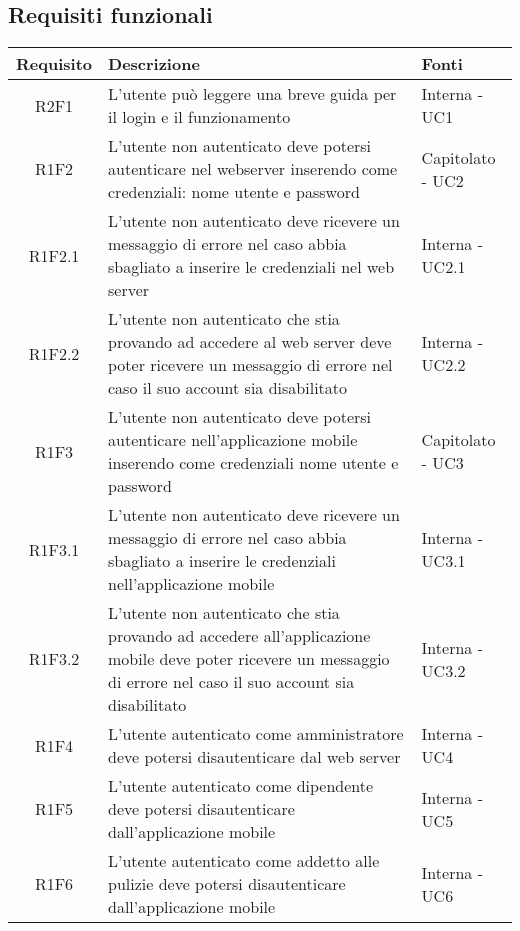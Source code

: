\subsection{Requisiti funzionali}
\begin{center}
	\begin{longtable}{|c|p{10cm}|p{4cm}|}
		\hline
		\rowcolor{lighter-grayer}
		\textbf{Requisito} & \textbf{Descrizione} & \textbf{Fonti}  \\
		\hline
		\endhead
		
		
		 R2F1 & L'utente può leggere una breve guida per il login e il funzionamento & Interna - UC1 \\
		\hline
		R1F2	&	L'utente non autenticato deve potersi autenticare nel webserver inserendo come credenziali: nome utente e password & Capitolato - UC2	\\
		\hline
		R1F2.1	&	L'utente non autenticato deve ricevere un messaggio di errore nel caso abbia sbagliato a inserire le credenziali nel web server& Interna - UC2.1	\\
		\hline
		R1F2.2	&	L'utente non autenticato che stia provando ad accedere al web server deve poter ricevere un messaggio di errore nel caso il suo account sia disabilitato& Interna - UC2.2	\\
		\hline
		R1F3	&	L'utente non autenticato deve potersi autenticare nell'applicazione mobile inserendo come credenziali nome utente e password & Capitolato - UC3	\\
		\hline
		R1F3.1	&	L'utente non autenticato deve ricevere un messaggio di errore nel caso abbia sbagliato a inserire le credenziali nell'applicazione mobile& Interna - UC3.1	\\
		\hline
		R1F3.2	&	L'utente non autenticato che stia provando ad accedere all'applicazione mobile deve poter ricevere un messaggio di errore nel caso il suo account sia disabilitato& Interna - UC3.2	\\
		\hline
		R1F4	&	L'utente autenticato come amministratore deve potersi disautenticare dal web server& Interna - UC4	\\
		\hline
		R1F5	&	L'utente autenticato come dipendente deve potersi disautenticare dall'applicazione mobile& Interna - UC5	\\
		\hline
		R1F6	&	L'utente autenticato come addetto alle pulizie deve potersi disautenticare dall'applicazione mobile& Interna - UC6	\\

\end{longtable}
\end{center}
